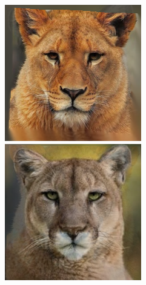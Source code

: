 \documentclass[conference]{IEEEtran}
\begin{document}
\begin{figure}[H]
\begin{multicols}{3}
    \includegraphics[width=1.0\linewidth]{results/cats/B/img10.png} \par
    \includegraphics[width=1.0\linewidth]{results/cats/B/img40.png} \par


\end{multicols}
\end{figure}
\end{document}

